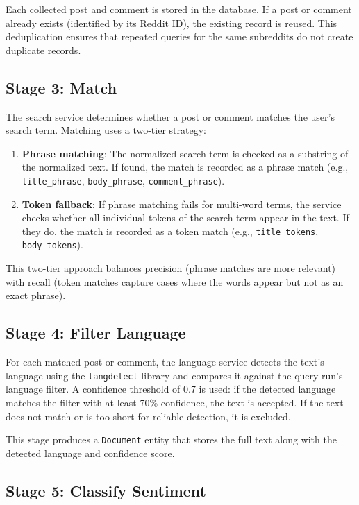 Each collected post and comment is stored in the database. If a post or comment already exists (identified by its Reddit ID), the existing record is reused. This deduplication ensures that repeated queries for the same subreddits do not create duplicate records.

\subsection{Stage 3: Match}

The search service determines whether a post or comment matches the user's search term. Matching uses a two-tier strategy:

\begin{enumerate}
    \item \textbf{Phrase matching}: The normalized search term is checked as a substring of the normalized text. If found, the match is recorded as a phrase match (e.g., \texttt{title\_phrase}, \texttt{body\_phrase}, \texttt{comment\_phrase}).
    \item \textbf{Token fallback}: If phrase matching fails for multi-word terms, the service checks whether all individual tokens of the search term appear in the text. If they do, the match is recorded as a token match (e.g., \texttt{title\_tokens}, \texttt{body\_tokens}).
\end{enumerate}

This two-tier approach balances precision (phrase matches are more relevant) with recall (token matches capture cases where the words appear but not as an exact phrase).

\subsection{Stage 4: Filter Language}

For each matched post or comment, the language service detects the text's language using the \texttt{langdetect} library and compares it against the query run's language filter. A confidence threshold of 0.7 is used: if the detected language matches the filter with at least 70\% confidence, the text is accepted. If the text does not match or is too short for reliable detection, it is excluded.

This stage produces a \texttt{Document} entity that stores the full text along with the detected language and confidence score.

\subsection{Stage 5: Classify Sentiment}

